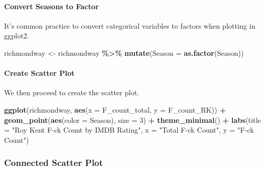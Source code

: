 \documentclass[
]{book}
\newenvironment{Shaded}{\begin{snugshade}}{\end{snugshade}}
\newcommand{\AttributeTok}[1]{\textcolor[rgb]{0.13,0.29,0.53}{#1}}
\newcommand{\DecValTok}[1]{\textcolor[rgb]{0.00,0.00,0.81}{#1}}
\newcommand{\FunctionTok}[1]{\textcolor[rgb]{0.13,0.29,0.53}{\textbf{#1}}}
\newcommand{\NormalTok}[1]{#1}
\newcommand{\OtherTok}[1]{\textcolor[rgb]{0.56,0.35,0.01}{#1}}
\newcommand{\SpecialCharTok}[1]{\textcolor[rgb]{0.81,0.36,0.00}{\textbf{#1}}}
\newcommand{\StringTok}[1]{\textcolor[rgb]{0.31,0.60,0.02}{#1}}
\begin{document}
\hypertarget{convert-seasons-to-factor}{%
\paragraph*{Convert Seasons to Factor}\label{convert-seasons-to-factor}}

It's common practice to convert categorical variables to factors when plotting in ggplot2.

\begin{Shaded}
\begin{Highlighting}[]
\NormalTok{richmondway }\OtherTok{\textless{}{-}}\NormalTok{ richmondway }\SpecialCharTok{\%\textgreater{}\%}
  \FunctionTok{mutate}\NormalTok{(}\AttributeTok{Season =} \FunctionTok{as.factor}\NormalTok{(Season))}
\end{Highlighting}
\end{Shaded}

\hypertarget{create-scatter-plot}{%
\paragraph*{Create Scatter Plot}\label{create-scatter-plot}}

We then proceed to create the scatter plot.

\begin{Shaded}
\begin{Highlighting}[]
\FunctionTok{ggplot}\NormalTok{(richmondway, }\FunctionTok{aes}\NormalTok{(}\AttributeTok{x =}\NormalTok{ F\_count\_total, }\AttributeTok{y =}\NormalTok{ F\_count\_RK)) }\SpecialCharTok{+}
  \FunctionTok{geom\_point}\NormalTok{(}\FunctionTok{aes}\NormalTok{(}\AttributeTok{color =}\NormalTok{ Season), }\AttributeTok{size =} \DecValTok{3}\NormalTok{) }\SpecialCharTok{+}
  \FunctionTok{theme\_minimal}\NormalTok{() }\SpecialCharTok{+} 
  \FunctionTok{labs}\NormalTok{(}\AttributeTok{title =} \StringTok{"Roy Kent F{-}ck Count by IMDB Rating"}\NormalTok{,}
       \AttributeTok{x =} \StringTok{"Total F{-}ck Count"}\NormalTok{,}
       \AttributeTok{y =} \StringTok{"F{-}ck Count"}\NormalTok{)}
\end{Highlighting}
\end{Shaded}

\hypertarget{connected-scatter-plot}{%
\subsubsection*{Connected Scatter Plot}\label{connected-scatter-plot}}
\end{document}
